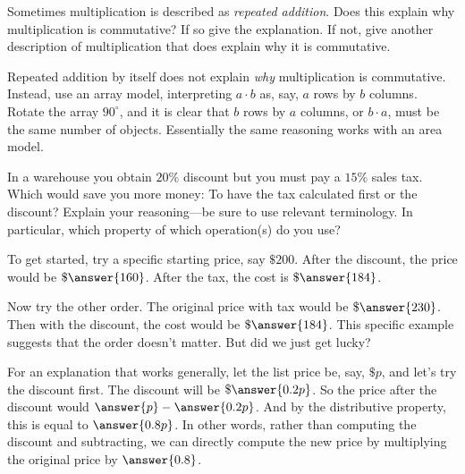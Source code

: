 \documentclass[nooutcomes]{ximera}
\begin{document}
\begin{problem}Sometimes multiplication is described as \textit{repeated
  addition}. Does this explain why multiplication is commutative? If
  so give the explanation. If not, give another description of
  multiplication that does explain why it is commutative.
\begin{freeResponse}
\begin{hint}
Repeated addition by itself does not explain \textit{why} multiplication is commutative.  Instead, use an array model, interpreting $a\cdot b$ as, say, $a$ rows by $b$ columns.  Rotate the array $90^\circ$, and it is clear that $b$ rows by $a$ columns, or $b\cdot a$, must be the same number of objects.  Essentially the same reasoning works with an area model.  
\end{hint}
\end{freeResponse}
\end{problem} 

\begin{problem}In a warehouse you obtain $20\%$ discount but you must pay a
  $15\%$ sales tax. Which would save you more money: To have the tax
  calculated first or the discount? Explain your reasoning---be sure
  to use relevant terminology.  In particular, which property 
of which operation(s) do you use?  
\begin{freeResponse}
\begin{hint}
To get started, try a specific starting price, say $\$200$.  After the discount, the price would be $\$\answer{160}$.  After the tax, the cost is $\$\answer{184}$.  

Now try the other order.  The original price with tax would be $\$\answer{230}$.  Then with the discount, the cost would be $\$\answer{184}$.  This specific example suggests that the order doesn't matter.  But did we just get lucky?  

\end{hint}
\begin{hint}
For an explanation that works generally, let the list price be, say, $\$p$, and let's try the discount first.  The discount will be $\$\answer{0.2p}$.  So the price after the discount would $\answer{p} - \answer{0.2p}$.  And by the distributive property, this is equal to $\answer{0.8p}$.  In other words, rather than computing the discount and subtracting, we can directly compute the new price by multiplying the original price by $\answer{0.8}$.
\end{hint}
\end{freeResponse}
\end{problem} 
\end{document}
